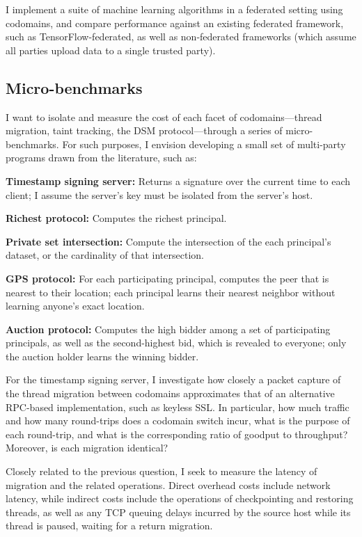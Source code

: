%
I implement a suite of machine learning algorithms in a federated setting using
codomains, and compare performance against an existing federated framework,
such as TensorFlow-federated, as well as non-federated frameworks (which
assume all parties upload data to a single trusted party).


\subsection{Micro-benchmarks}

I want to isolate and measure the cost
of each facet of codomains---thread migration, taint tracking, the DSM
protocol---through a series of micro-benchmarks.
%
For such purposes, I envision developing a small set of multi-party programs
drawn from the literature, such as:

\begin{widelist}
\item \textbf{Timestamp signing server:} Returns a signature over the current
time to each client; I assume the server's key must be isolated from the
server's host.
%
\item \textbf{Richest protocol:} Computes the richest principal.
%
\item \textbf{Private set intersection:} Compute the intersection of the each
    principal's dataset, or the cardinality of that intersection.
\item \textbf{GPS protocol:} For each participating principal,
computes the peer that is nearest to their location; each principal learns
their nearest neighbor without learning anyone's exact location.
%
\item \textbf{Auction protocol:} Computes the high bidder among a set of
participating principals, as well as the second-highest bid, which is revealed
to everyone; only the auction holder learns the winning bidder.
\end{widelist}

For the timestamp signing server, I investigate how closely a
packet capture of the thread migration between codomains approximates
that of an alternative RPC-based implementation, such as keyless SSL\@.
%
In particular, how much traffic and how many round-trips does a codomain switch
incur, what is the purpose of each round-trip, and what is the corresponding
ratio of goodput to throughput?
%
Moreover, is each migration identical?


Closely related to the previous question, I seek to measure the latency of
migration and the related operations.
%
Direct overhead costs include network latency, while indirect costs include the
operations of checkpointing and restoring threads, as well as any TCP queuing
delays incurred by the source host while its thread is paused, waiting for
a return migration.


